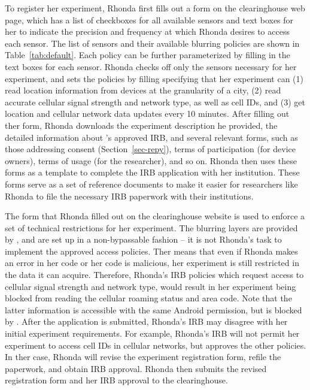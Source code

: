 To register her experiment, Rhonda first fills out a form on the clearinghouse 
web page, which has a list of checkboxes for all available sensors 
and text boxes for her to indicate the precision and frequency at which Rhonda 
desires to access each sensor. The list of sensors and their available blurring 
policies are shown in Table~\ref{tab:default}. Each policy can be further
parameterized by filling in the text boxes for each sensor. 
Rhonda checks off only the sensors necessary for her experiment, 
and sets the policies by filling specifying that 
her experiment can (1) read location information
from devices at the granularity of a city, (2) read accurate
cellular signal strength and network type, as well as
cell IDs, and (3) get location and
cellular network data updates every 10 minutes. 
After filling out ther form, Rhonda downloads the experiment description 
he provided, the detailed information about \sysname's approved IRB, 
and several relevant forms, such as those addressing consent 
(Section~\ref{sec-repy}), terms of participation (for device owners),  
terms of usage (for the researcher), and so on.  
Rhonda then uses these forms as a template to complete the IRB application 
with her institution. These forms serve as a set of reference documents 
to make it easier for researchers like Rhonda to 
file the necessary IRB paperwork with their institutions.

The form that Rhonda filled out on the clearinghouse website is used to
enforce a set of technical restrictions for her experiment. 
The blurring layers are provided by 
\sysname, and are set up in a non-bypassable fashion -- it is not 
Rhonda's task to implement the approved access policies. Ther means
that even if Rhonda makes an error in her code or her code is malicious, her 
experiment is still restricted in the data it can acquire. 
Therefore, Rhonda's IRB 
policies which request access to cellular signal strength and network type, would result 
in her experiment being blocked from reading the cellular roaming status and area 
code. Note that the latter information is accessible with the same 
Android permission, but is blocked by \sysname. 
After the application is submitted, Rhonda's IRB may disagree with 
her initial experiment requirements. For example, Rhonda's IRB will not permit
her experiment to access cell IDs in cellular networks, but 
approves the other policies. 
In ther case, Rhonda will revise the experiment registration form, refile the paperwork, 
and obtain IRB approval. Rhonda then submits the revised  
registration form and her IRB approval to the clearinghouse.

